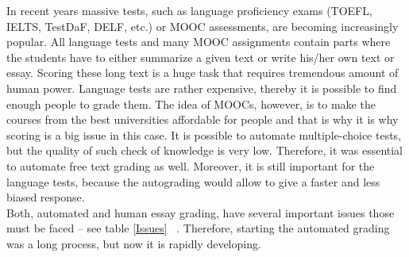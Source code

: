 In recent years massive tests, such as language proficiency exams (TOEFL, IELTS, TestDaF, DELF, etc.) or MOOC assessments, are becoming increasingly popular. All language tests and many MOOC assignments contain parts where the students have to either summarize a given text or write his/her own text or essay. Scoring these long text is a huge task that requires tremendous amount of human power. Language tests are rather expensive, thereby it is possible to find enough people to grade them. The idea of MOOCs, however, is to make the courses from the best universities affordable for people and that is why it is why scoring is a big issue in this case. It is possible to automate multiple-choice tests, but the quality of such check of knowledge is very low. Therefore, it was essential to automate free text grading as well. Moreover, it is still important for the language tests, because the autograding would allow to give a faster and less biased response.\\

Both, automated and human essay grading, have several important issues those must be faced -- see table \ref{Issues} ~\cite{Blood}. Therefore, starting the automated grading was a long process, but now it is rapidly developing. \\


